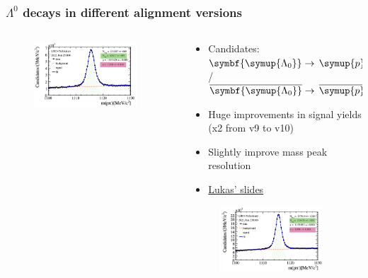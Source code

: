 \documentclass[aspectratio=1610, 12pt, xcolor=dvipsnames]{beamer}
\begin{document}
\begin{frame}\frametitle{$\Lambda^0$ decays in different alignment versions}
  \begin{columns}
    \begin{column}[c]{0.49\textwidth}
      \begin{figure}
        \includegraphics[width=0.9\textwidth]{plots/v9_lambda.png}
      \end{figure}
    \end{column}
    \begin{column}[c]{0.49\textwidth}
      \begin{itemize}
        \item Candidates: $\symbf{\symup{\Lambda_0}} \to\, \symup{p} \pi^{-}$/$\overline{\symbf{\symup{\Lambda_0}}} \to\, \overline{\symup{p}} \pi{+}$
        \item Huge improvements in signal yields (x2 from v9 to v10)
        \item Slightly improve mass peak resolution
        \item \href{https://indico.cern.ch/event/1275407/contributions/5419773/attachments/2653633/4595138/LC_WP4_5_250523.pdf}{Lukas' slides} %
      \end{itemize}
      \begin{figure}
        \includegraphics[width=0.9\textwidth]{plots/v10_lambda.png}
      \end{figure}
    \end{column}
  \end{columns}
\end{frame}
\end{document}
